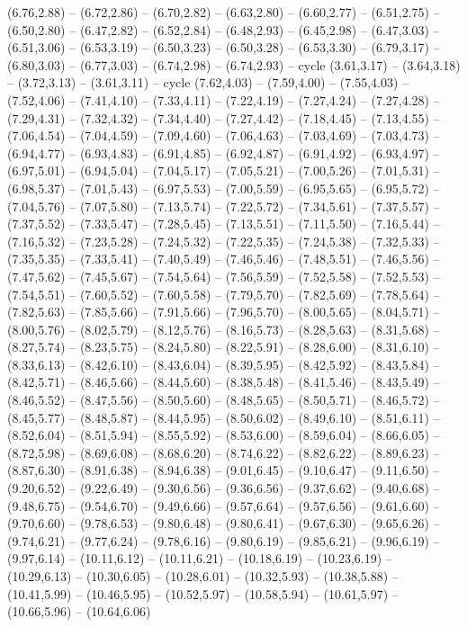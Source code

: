 \expandafter\def\csname geo:gebiet:TCD\endcsname{
  (6.76,2.88) -- (6.72,2.86) -- (6.70,2.82) -- (6.63,2.80) -- (6.60,2.77) -- (6.51,2.75) -- (6.50,2.80) -- (6.47,2.82) -- (6.52,2.84) -- (6.48,2.93) -- (6.45,2.98) -- (6.47,3.03) -- (6.51,3.06) -- (6.53,3.19) -- (6.50,3.23) -- (6.50,3.28) -- (6.53,3.30) -- (6.79,3.17) -- (6.80,3.03) -- (6.77,3.03) -- (6.74,2.98) -- (6.74,2.93) -- cycle}
\expandafter\def\csname geo:gebiet:HTI\endcsname{
  }
\expandafter\def\csname geo:gebiet:DOM\endcsname{
  (3.61,3.17) -- (3.64,3.18) -- (3.72,3.13) -- (3.61,3.11) -- cycle}
\expandafter\def\csname geo:gebiet:RUS\endcsname{
  (7.62,4.03) -- (7.59,4.00) -- (7.55,4.03) -- (7.52,4.06) -- (7.41,4.10) -- (7.33,4.11) -- (7.22,4.19) -- (7.27,4.24) -- (7.27,4.28) -- (7.29,4.31) -- (7.32,4.32) -- (7.34,4.40) -- (7.27,4.42) -- (7.18,4.45) -- (7.13,4.55) -- (7.06,4.54) -- (7.04,4.59) -- (7.09,4.60) -- (7.06,4.63) -- (7.03,4.69) -- (7.03,4.73) -- (6.94,4.77) -- (6.93,4.83) -- (6.91,4.85) -- (6.92,4.87) -- (6.91,4.92) -- (6.93,4.97) -- (6.97,5.01) -- (6.94,5.04) -- (7.04,5.17) -- (7.05,5.21) -- (7.00,5.26) -- (7.01,5.31) -- (6.98,5.37) -- (7.01,5.43) -- (6.97,5.53) -- (7.00,5.59) -- (6.95,5.65) -- (6.95,5.72) -- (7.04,5.76) -- (7.07,5.80) -- (7.13,5.74) -- (7.22,5.72) -- (7.34,5.61) -- (7.37,5.57) -- (7.37,5.52) -- (7.33,5.47) -- (7.28,5.45) -- (7.13,5.51) -- (7.11,5.50) -- (7.16,5.44) -- (7.16,5.32) -- (7.23,5.28) -- (7.24,5.32) -- (7.22,5.35) -- (7.24,5.38) -- (7.32,5.33) -- (7.35,5.35) -- (7.33,5.41) -- (7.40,5.49) -- (7.46,5.46) -- (7.48,5.51) -- (7.46,5.56) -- (7.47,5.62) -- (7.45,5.67) -- (7.54,5.64) -- (7.56,5.59) -- (7.52,5.58) -- (7.52,5.53) -- (7.54,5.51) -- (7.60,5.52) -- (7.60,5.58) -- (7.79,5.70) -- (7.82,5.69) -- (7.78,5.64) -- (7.82,5.63) -- (7.85,5.66) -- (7.91,5.66) -- (7.96,5.70) -- (8.00,5.65) -- (8.04,5.71) -- (8.00,5.76) -- (8.02,5.79) -- (8.12,5.76) -- (8.16,5.73) -- (8.28,5.63) -- (8.31,5.68) -- (8.27,5.74) -- (8.23,5.75) -- (8.24,5.80) -- (8.22,5.91) -- (8.28,6.00) -- (8.31,6.10) -- (8.33,6.13) -- (8.42,6.10) -- (8.43,6.04) -- (8.39,5.95) -- (8.42,5.92) -- (8.43,5.84) -- (8.42,5.71) -- (8.46,5.66) -- (8.44,5.60) -- (8.38,5.48) -- (8.41,5.46) -- (8.43,5.49) -- (8.46,5.52) -- (8.47,5.56) -- (8.50,5.60) -- (8.48,5.65) -- (8.50,5.71) -- (8.46,5.72) -- (8.45,5.77) -- (8.48,5.87) -- (8.44,5.95) -- (8.50,6.02) -- (8.49,6.10) -- (8.51,6.11) -- (8.52,6.04) -- (8.51,5.94) -- (8.55,5.92) -- (8.53,6.00) -- (8.59,6.04) -- (8.66,6.05) -- (8.72,5.98) -- (8.69,6.08) -- (8.68,6.20) -- (8.74,6.22) -- (8.82,6.22) -- (8.89,6.23) -- (8.87,6.30) -- (8.91,6.38) -- (8.94,6.38) -- (9.01,6.45) -- (9.10,6.47) -- (9.11,6.50) -- (9.20,6.52) -- (9.22,6.49) -- (9.30,6.56) -- (9.36,6.56) -- (9.37,6.62) -- (9.40,6.68) -- (9.48,6.75) -- (9.54,6.70) -- (9.49,6.66) -- (9.57,6.64) -- (9.57,6.56) -- (9.61,6.60) -- (9.70,6.60) -- (9.78,6.53) -- (9.80,6.48) -- (9.80,6.41) -- (9.67,6.30) -- (9.65,6.26) -- (9.74,6.21) -- (9.77,6.24) -- (9.78,6.16) -- (9.80,6.19) -- (9.85,6.21) -- (9.96,6.19) -- (9.97,6.14) -- (10.11,6.12) -- (10.11,6.21) -- (10.18,6.19) -- (10.23,6.19) -- (10.29,6.13) -- (10.30,6.05) -- (10.28,6.01) -- (10.32,5.93) -- (10.38,5.88) -- (10.41,5.99) -- (10.46,5.95) -- (10.52,5.97) -- (10.58,5.94) -- (10.61,5.97) -- (10.66,5.96) -- (10.64,6.06) }

